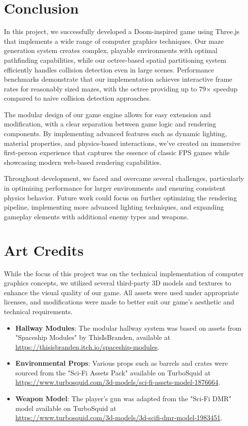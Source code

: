 \documentclass{article}
\begin{document}
\section{Conclusion}
In this project, we successfully developed a Doom-inspired game using Three.js
that implements a wide range of computer graphics techniques. Our maze
generation system creates complex, playable environments with optimal
pathfinding capabilities, while our octree-based spatial partitioning system
efficiently handles collision detection even in large scenes. Performance
benchmarks demonstrate that our implementation achieves interactive frame rates
for reasonably sized mazes, with the octree providing up to 79× speedup
compared to naive collision detection approaches.

The modular design of our game engine allows for easy extension and
modification, with a clear separation between game logic and rendering
components. By implementing advanced features such as dynamic lighting,
material properties, and physics-based interactions, we've created an immersive
first-person experience that captures the essence of classic FPS games while
showcasing modern web-based rendering capabilities.

Throughout development, we faced and overcame several challenges, particularly
in optimizing performance for larger environments and ensuring consistent
physics behavior. Future work could focus on further optimizing the rendering
pipeline, implementing more advanced lighting techniques, and expanding
gameplay elements with additional enemy types and weapons.


\pagebreak
\section{Art Credits}
While the focus of this project was on the technical implementation of computer graphics concepts, we utilized several third-party 3D models and textures to enhance the visual quality of our game. All assets were used under appropriate licenses, and modifications were made to better suit our game's aesthetic and technical requirements.

\begin{itemize}
    \item \textbf{Hallway Modules}: The modular hallway system was based on
	    assets from "Spaceship Modules" by ThisIsBranden, available at
		\url{https://thisisbranden.itch.io/spaceship-modules}.

    \item \textbf{Environmental Props}: Various props such as barrels and
	    crates were sourced from the "Sci-Fi Assets Pack" available on
		TurboSquid at
		\url{https://www.turbosquid.com/3d-models/sci-fi-assets-model-1876664}.

    \item \textbf{Weapon Model}: The player's gun was adapted from the "Sci-Fi
	    DMR" model available on TurboSquid
		at\\\url{https://www.turbosquid.com/3d-models/3d-scifi-dmr-model-1983451}.
\end{itemize}
\end{document}
